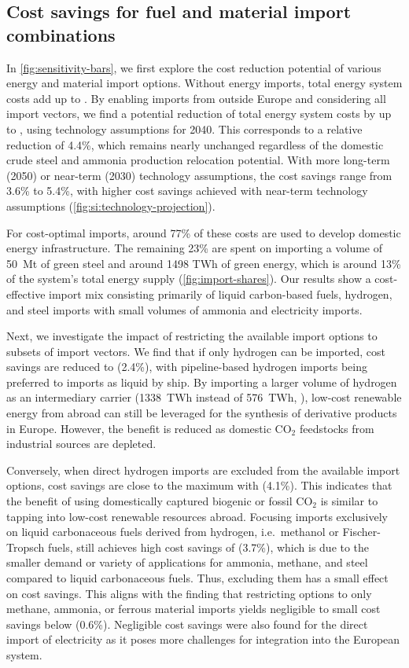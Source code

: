 \subsection*{Cost savings for fuel and material import combinations}
\label{sec:results-2}

In \cref{fig:sensitivity-bars}, we first explore the cost reduction potential of
various energy and material import options. Without energy imports, total energy
system costs add up to . By enabling imports from outside Europe and
considering all import vectors, we find a potential reduction of total energy
system costs by up to , using technology assumptions for 2040. This
corresponds to a relative reduction of 4.4\%, which remains nearly unchanged
regardless of the domestic crude steel and ammonia production relocation potential.
With more long-term (2050) or near-term (2030) technology assumptions, the cost
savings range from 3.6\% to 5.4\%, with higher cost savings achieved with
near-term technology assumptions (\cref{fig:si:technology-projection}).

For cost-optimal imports, around 77\% of these costs are used to develop
domestic energy infrastructure. The remaining 23\% are spent on importing a
volume of 50~Mt of green steel and around 1498 TWh of green energy, which is
around 13\% of the system's total energy supply (\cref{fig:import-shares}). Our
results show a cost-effective import mix consisting primarily of liquid
carbon-based fuels, hydrogen, and steel imports with small volumes of ammonia
and electricity imports.

Next, we investigate the impact of restricting the available import options to
subsets of import vectors. We find that if only hydrogen can be imported, cost
savings are reduced to  (2.4\%), with pipeline-based hydrogen imports
being preferred to imports as liquid by ship. By importing a larger volume of
hydrogen as an intermediary carrier (1338~TWh instead of 576~TWh,
), low-cost renewable energy from abroad can
still be leveraged for the synthesis of derivative products in Europe. However,
the benefit is reduced as domestic CO$_2$ feedstocks from industrial sources are
depleted.

Conversely, when direct hydrogen imports are excluded from the available import
options, cost savings are close to the maximum with  (4.1\%). This
indicates that the benefit of using domestically captured biogenic or fossil
CO$_2$ is similar to tapping into low-cost renewable resources abroad. Focusing
imports exclusively on liquid carbonaceous fuels derived from hydrogen,
i.e.~methanol or Fischer-Tropsch fuels, still achieves high cost savings of
 (3.7\%), which is due to the smaller demand or variety of
applications for ammonia, methane, and steel compared to liquid carbonaceous
fuels. Thus, excluding them has a small effect on cost savings. This aligns with
the finding that restricting options to only methane, ammonia, or ferrous
material imports yields negligible to small cost savings below 
(0.6\%). Negligible cost savings were also found for the direct import of
electricity as it poses more challenges for integration into the European
system.

